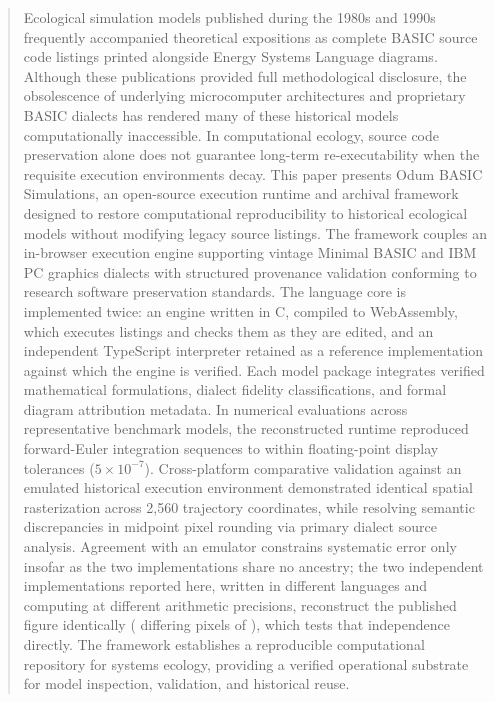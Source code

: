 \documentclass[11pt,a4paper]{article}
\begin{document}
\begin{abstract}
Ecological simulation models published during the 1980s and 1990s frequently accompanied theoretical expositions as complete BASIC source code listings printed alongside Energy Systems Language diagrams. Although these publications provided full methodological disclosure, the obsolescence of underlying microcomputer architectures and proprietary BASIC dialects has rendered many of these historical models computationally inaccessible. In computational ecology, source code preservation alone does not guarantee long-term re-executability when the requisite execution environments decay. This paper presents Odum BASIC Simulations, an open-source execution runtime and archival framework designed to restore computational reproducibility to historical ecological models without modifying legacy source listings. The framework couples an in-browser execution engine supporting vintage Minimal BASIC and IBM PC graphics dialects with structured provenance validation conforming to research software preservation standards. The language core is implemented twice: an engine written in C, compiled to WebAssembly, which executes listings and checks them as they are edited, and an independent TypeScript interpreter retained as a reference implementation against which the engine is verified. Each model package integrates verified mathematical formulations, dialect fidelity classifications, and formal diagram attribution metadata. In numerical evaluations across representative benchmark models, the reconstructed runtime reproduced forward-Euler integration sequences to within floating-point display tolerances ($5\times10^{-7}$). Cross-platform comparative validation against an emulated historical execution environment demonstrated identical spatial rasterization across 2,560 trajectory coordinates, while resolving semantic discrepancies in midpoint pixel rounding via primary dialect source analysis. Agreement with an emulator constrains systematic error only insofar as the two implementations share no ancestry; the two independent implementations reported here, written in different languages and computing at different arithmetic precisions, reconstruct the published figure identically (\oracleEnginesDiffering{} differing pixels of \oracleScreenPixels{}), which tests that independence directly. The framework establishes a reproducible computational repository for systems ecology, providing a verified operational substrate for model inspection, validation, and historical reuse.

\end{abstract}
\end{document}
